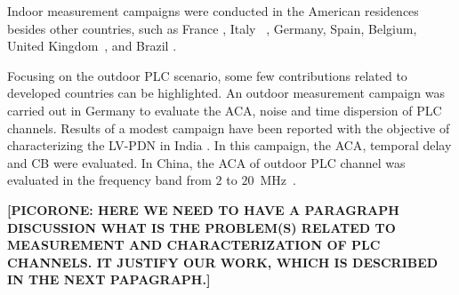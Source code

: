 \documentclass[journal]{IEEEtran}
\begin{document}
	
	Indoor measurement campaigns were conducted in the American residences \cite{Liu1999, O'Mahony2006} besides other countries, such as France \cite{Tlich2008,Tlich2008a,Schneider2012}, Italy ~\cite{Tonello2014}, Germany, Spain, Belgium, United Kingdom~\cite{Schneider2012}, and Brazil \cite{Oliveira2017}. 
	
	Focusing on the outdoor PLC scenario, some few contributions related to developed countries can be highlighted. An outdoor measurement campaign was carried out in Germany to evaluate the \ac{ACA}, noise and time dispersion of PLC channels. Results of a modest campaign have been reported with the objective of characterizing the \ac{LV-PDN} in India \cite{Prasad2001}. In this campaign, the \ac{ACA}, temporal delay and \ac{CB} were evaluated. In China, the \ac{ACA} of outdoor PLC channel was evaluated in the frequency band from $2$ to $20$~MHz~\cite{Zhai2011}.\color{black}
	
	
	\textbf{[PICORONE: HERE WE NEED TO HAVE A PARAGRAPH DISCUSSION WHAT IS THE PROBLEM(S) RELATED TO MEASUREMENT AND CHARACTERIZATION OF PLC CHANNELS. IT JUSTIFY OUR WORK, WHICH IS DESCRIBED IN THE NEXT PAPAGRAPH.]}
	
\end{document}
